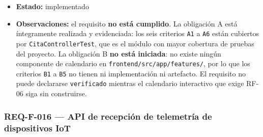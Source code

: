 \documentclass[
  spanish,
]{article}
\begin{document}
\begin{itemize}
  \texttt{vacunas.\allowbreak{}component.\allowbreak{}ts}); wireframe conceptual de la Entrega 1A
  (\texttt{PFC\_\allowbreak{}Entrega1\allowbreak{}A\_\allowbreak{}BMT.\allowbreak{}pdf}, sección 7).
\item
  \textbf{Estado:} implementado
\item
  \textbf{Observaciones:} el requisito \textbf{no está cumplido}. La
  obligación A está íntegramente realizada y evidenciada: los seis
  criterios \texttt{A1} a \texttt{A6} están cubiertos por
  \texttt{Cita\allowbreak{}Controller\allowbreak{}Test}, que es el módulo con mayor cobertura de
  pruebas del proyecto. La obligación B \textbf{no está iniciada}: no
  existe ningún componente de calendario en
  \texttt{frontend/\allowbreak{}src/\allowbreak{}app/\allowbreak{}features/}, por lo que los criterios
  \texttt{B1} a \texttt{B5} no tienen ni implementación ni artefacto. El
  requisito no puede declararse \texttt{verificado} mientras el
  calendario interactivo que exige RF-06 siga sin construirse.
\end{itemize}

\subsubsection{REQ-F-016 --- API de recepción de telemetría de
dispositivos
IoT}\label{req-f-016-api-de-recepciuxf3n-de-telemetruxeda-de-dispositivos-iot}
\end{document}
